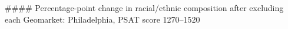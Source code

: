 #### Percentage-point change in racial/ethnic composition after excluding each Geomarket: Philadelphia, PSAT score 1270–1520
